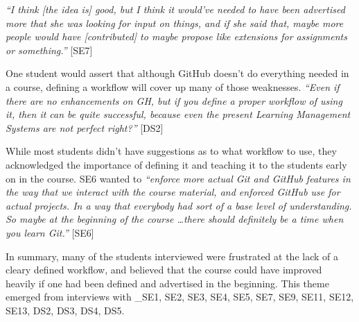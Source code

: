 \textit{``I think [the idea is] good, but I think it would've needed to have been advertised more that she was looking for input on things, and if she said that, maybe more people would have [contributed] to maybe propose like extensions for assignments or something.''} [SE7]

One student would assert that although GitHub doesn't do everything needed in a course, defining a workflow will cover up many of those weaknesses. \textit{``Even if there are no enhancements on GH, but if you define a proper workflow of using it, then it can be quite successful, because even the present Learning Management Systems are not perfect right?''} [DS2]

While most students didn't have suggestions as to what workflow to use, they acknowledged the importance of defining it and teaching it to the students early on in the course. SE6 wanted to \textit{``enforce more actual Git and GitHub features in the way that we interact with the course material, and enforced GitHub use for actual projects. In a way that everybody had sort of a base level of understanding. So maybe at the beginning of the course \ldots there should definitely be a time when you learn Git.''} [SE6]

In summary, many of the students interviewed were frustrated at the lack of a cleary defined workflow, and believed that the course could have improved heavily if one had been defined and advertised in the beginning. This theme emerged from interviews with _{SE1, SE2, SE3, SE4, SE5, SE7, SE9, SE11, SE12, SE13, DS2, DS3, DS4, DS5}.



